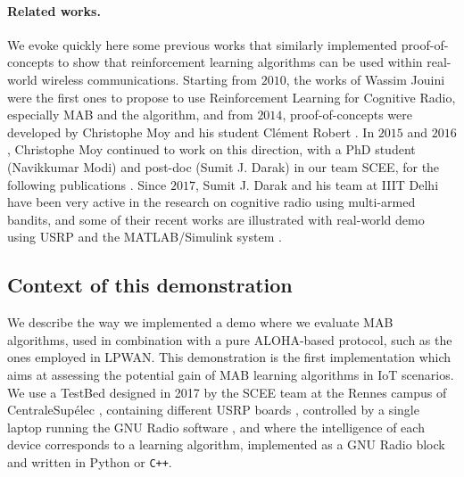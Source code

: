 \paragraph{Related works.}
%
We evoke quickly here some previous works that similarly implemented proof-of-concepts to show that reinforcement learning algorithms can be used within real-world wireless communications.
Starting from $2010$, the works of Wassim Jouini \cite{Jouini09,Jouini10,Jouini12} were the first ones to propose to use Reinforcement Learning for Cognitive Radio, especially MAB and the \UCB{} algorithm, and from $2014$, proof-of-concepts were developed by Christophe Moy and his student Clément Robert \cite{RobertSDR2014,MoyWSR2014}.
In $2015$ and $2016$, Christophe Moy continued to work on this direction, with a PhD student (Navikkumar Modi) and post-doc (Sumit J. Darak) in our team SCEE, for the following publications
\cite{darak2016bayesian,Darak16,modiDemo2016,kumar2016two}.
Since $2017$, Sumit J. Darak and his team at IIIT Delhi have been very active in the research on cognitive radio using multi-armed bandits, and some of their recent works are illustrated with real-world demo using USRP and the MATLAB/Simulink system
\cite{KumarYadav2018,SawantKumar2018,JoshiKumar2018}.


\subsection{Context of this demonstration}
\label{sub:42:motivation}

We describe the way we implemented a demo where we evaluate MAB algorithms, used in combination with a pure ALOHA-based protocol, such as the ones employed in LPWAN.
This demonstration is the first implementation which aims at assessing the potential gain of MAB learning algorithms in IoT scenarios.
%
We use a TestBed designed in 2017 by the SCEE team at the Rennes campus of CentraleSupélec \cite[Appendix~3]{Bodinier17}, containing different USRP boards \cite{USRPDocumentation}, controlled by a single laptop running the GNU Radio software \cite{GNURadioDocumentation},
and where the intelligence of each device corresponds to a learning algorithm, implemented as a GNU Radio block \cite{GNURadioCompanionDocumentation} and written in Python or \texttt{C++}.

